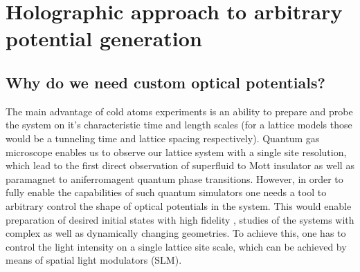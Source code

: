 
\chapter{Holographic approach to arbitrary potential generation}

\section{Why do we need custom optical potentials?}
The main advantage of cold atoms experiments is an ability to prepare and probe the system on it's characteristic time and length scales (for a lattice models those would be a tunneling time and lattice spacing respectively). Quantum gas microscope enables us to observe our lattice system with a single site resolution, which lead to the first direct observation of superfluid to Mott insulator \cite{Bakr2010, bloch} as well as paramagnet to aniferromagent \cite{Simon2011, Parsons??} quantum phase transitions. However, in order to fully enable the capabilities of such quantum simulators one needs a tool to arbitrary control the shape of optical potentials in the system. This would enable preparation of desired initial states with high fidelity \cite{us, somebody else?}, studies of the systems with complex \cite{Tilman QPC, Roatti QPC} as well as dynamically changing \cite{??} geometries. To achieve this, one has to control the light intensity on a single lattice site scale, which can be achieved by means of spatial light modulators (SLM).

